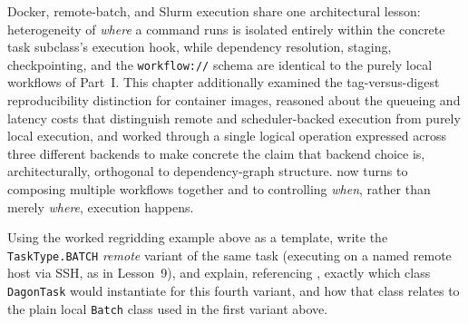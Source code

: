 Docker, remote-batch, and Slurm execution share one architectural lesson:
heterogeneity of \emph{where} a command runs is isolated entirely within the
concrete task subclass's execution hook, while dependency resolution,
staging, checkpointing, and the \texttt{workflow://} schema are identical to
the purely local workflows of Part~I. This chapter additionally examined the
tag-versus-digest reproducibility distinction for container images, reasoned
about the queueing and latency costs that distinguish remote and
scheduler-backed execution from purely local execution, and worked through a
single logical operation expressed across three different backends to make
concrete the claim that backend choice is, architecturally, orthogonal to
dependency-graph structure.  now turns to composing
multiple workflows together and to controlling \emph{when}, rather than
merely \emph{where}, execution happens.

\begin{exercise}
Using the worked regridding example above as a template, write the
\texttt{TaskType.BATCH} \emph{remote} variant of the same task (executing on
a named remote host via SSH, as in Lesson~9), and explain, referencing
, exactly which class \texttt{DagonTask}
would instantiate for this fourth variant, and how that class relates to
the plain local \texttt{Batch} class used in the first variant above.
\end{exercise}
